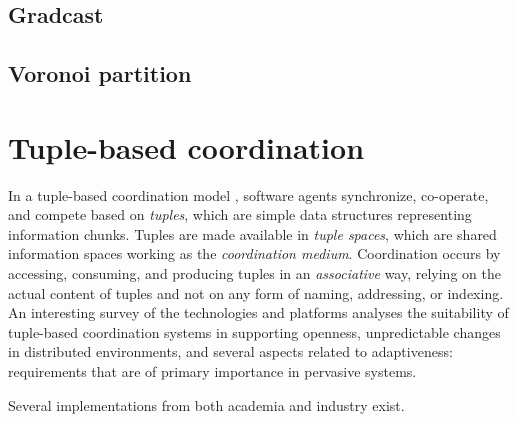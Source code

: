 \documentclass[12pt,a4paper,twoside,openright]{book}
\begin{document}
\cite{crf}

\subsection{Gradcast}

\subsection{Voronoi partition}

\section{Tuple-based coordination}

In a tuple-based coordination model \cite{coordbook2001--ch04}, software agents synchronize, co-operate, and compete based on \emph{tuples}, which are simple data structures representing information chunks.
%
Tuples are made available in \emph{tuple spaces}, which are shared information spaces working as the \emph{coordination medium}.
%
Coordination occurs by accessing, consuming, and producing tuples in an \emph{associative} way, relying on the actual content of tuples and not on any form of naming, addressing, or indexing.
%
An interesting survey of the technologies and platforms \cite{adaptivenesslinda-esoaI} analyses the suitability of tuple-based coordination systems in supporting openness, unpredictable changes in distributed environments, and several aspects related to adaptiveness: requirements that are of primary importance in pervasive systems.

Several implementations from both academia and industry exist.
\end{document}
